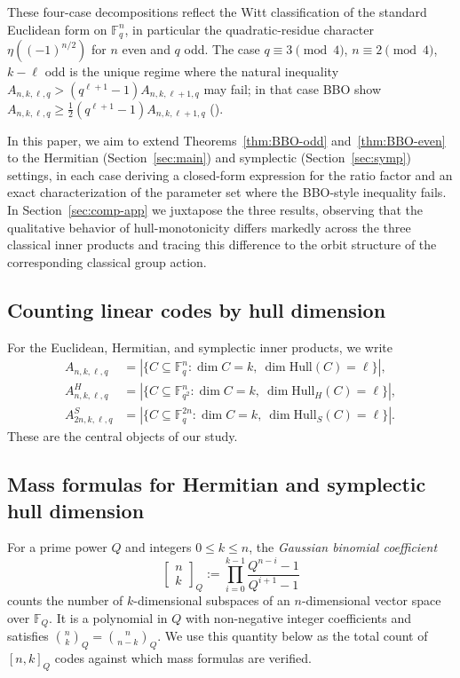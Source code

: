 \documentclass[10pt,a4paper]{amsart}
\newcommand{\F}{\mathbb{F}}
\newcommand{\HHull}{\mathrm{Hull}_H}
\begin{document}
These four-case decompositions reflect the Witt classification of the standard
Euclidean form on $\F_q^n$, in particular the quadratic-residue character
$\eta((-1)^{n/2})$ for $n$ even and $q$ odd. The case $q \equiv 3 \pmod 4$,
$n \equiv 2 \pmod 4$, $k - \ell$ odd is the unique regime where the natural
inequality $A_{n,k,\ell,q} > (q^{\ell+1}-1) A_{n,k,\ell+1,q}$ may fail; in
that case BBO show $A_{n,k,\ell,q} \geq \tfrac{1}{2}(q^{\ell+1}-1) A_{n,k,\ell+1,q}$
(\cite[Theorem~12]{BBOz2026}).

In this paper, we aim to extend
Theorems~\ref{thm:BBO-odd} and~\ref{thm:BBO-even} to the Hermitian
(Section~\ref{sec:main}) and symplectic (Section~\ref{sec:symp}) settings,
in each case deriving a closed-form expression for the ratio factor and an
exact characterization of the parameter set where the BBO-style inequality fails.
In Section~\ref{sec:comp-app} we juxtapose the three results, observing
that the qualitative behavior of hull-monotonicity differs markedly across
the three classical inner products and tracing this difference to the orbit
structure of the corresponding classical group action.

\subsection{Counting linear codes by hull dimension}\label{sec:prelim-counts}

For the Euclidean, Hermitian, and symplectic inner products, we write
\begin{align*}
  A_{n,k,\ell,q}    &= |\{C \subseteq \F_q^n : \dim C = k,\ \dim \mathrm{Hull}(C) = \ell\}|, \\
  A^H_{n,k,\ell,q}  &= |\{C \subseteq \F_{q^2}^n : \dim C = k,\ \dim \HHull(C) = \ell\}|, \\
  A^S_{2n,k,\ell,q} &= |\{C \subseteq \F_q^{2n} : \dim C = k,\ \dim \mathrm{Hull}_S(C) = \ell\}|.
\end{align*}
These are the central objects of our study.

\subsection{Mass formulas for Hermitian and symplectic hull dimension}\label{sec:prelim-mass}

For a prime power $Q$ and integers $0 \leq k \leq n$, the
\emph{Gaussian binomial coefficient}
\[
  \begin{bmatrix} n \\ k \end{bmatrix}_Q
  := \prod_{i=0}^{k-1} \frac{Q^{n-i} - 1}{Q^{i+1} - 1}
\]
counts the number of $k$-dimensional subspaces of an $n$-dimensional vector
space over $\F_Q$. It is a polynomial in $Q$ with non-negative integer
coefficients and satisfies $\binom{n}{k}_Q = \binom{n}{n-k}_Q$. We use this
quantity below as the total count of $[n,k]_Q$ codes against which mass
formulas are verified.
\end{document}
